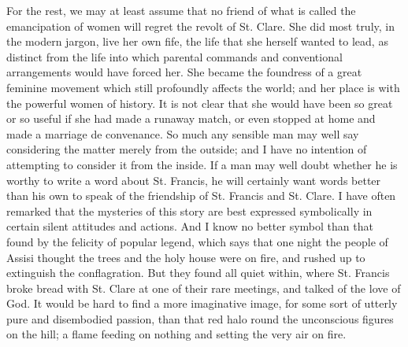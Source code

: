 \documentclass{book}
\begin{document}
For the rest, we may at least assume that no friend of what is called the emancipation of women will regret the revolt of St. Clare. She did most truly, in the modern jargon, live her own fife, the life that she herself wanted to lead, as distinct from the life into which parental commands and conventional arrangements would have forced her. She became the foundress of a great feminine movement which still profoundly affects the world; and her place is with the powerful women of history. It is not clear that she would have been so great or so useful if she had made a runaway match, or even stopped at home and made a marriage de convenance. So much any sensible man may well say considering the matter merely from the outside; and I have no intention of attempting to consider it from the inside. If a man may well doubt whether he is worthy to write a word about St. Francis, he will certainly want words better than his own to speak of the friendship of St. Francis and St. Clare. I have often remarked that the mysteries of this story are best expressed symbolically in certain silent attitudes and actions. And I know no better symbol than that found by the felicity of popular legend, which says that one night the people of Assisi thought the trees and the holy house were on fire, and rushed up to extinguish the conflagration. But they found all quiet within, where St. Francis broke bread with St. Clare at one of their rare meetings, and talked of the love of God. It would be hard to find a more imaginative image, for some sort of utterly pure and disembodied passion, than that red halo round the unconscious figures on the hill; a flame feeding on nothing and setting the very air on fire.
\end{document}
